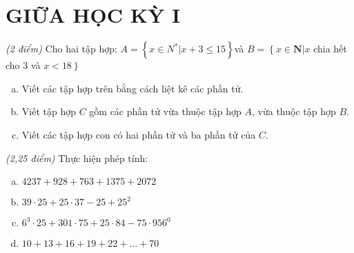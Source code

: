 \section{GIỮA HỌC KỲ I}
\setcounter{ex}{0}
\begin{ex} \textit{(2 điểm)}
Cho hai tập hợp: $A = \left\{ x\in {N^*}| x+3\le 15  \right\}$và $B = \left\{ x\in  \mathbf{N}|x \right.$ chia hết cho 3 và $\left. x<18 \right\}$
\begin{enumerate} [a)]
\item Viết các tập hợp trên bằng cách liệt kê các phần tử.
\item Viết tập hợp $C$ gồm các phần tử vừa thuộc tập hợp $A$, vừa thuộc tập hợp $B$. 
\item Viết các tập hợp con có hai phần tử và ba phần tử của $C$.
\end{enumerate}
\end{ex}    \begin{ex}  \textit{(2,25 điểm)} Thực hiện phép tính:
\begin{enumerate} [a)]
\item $4237+928+763+1375+2072$
\item $39\cdot 25+25\cdot 37-25+{{25}^{2}}$
\item ${{6}^{3}}\cdot 25+301\cdot 75+25\cdot 84-75\cdot {{956}^{0}}$
\item $10+13+16+19+22+...+70$


\end{enumerate}
\end{ex}
